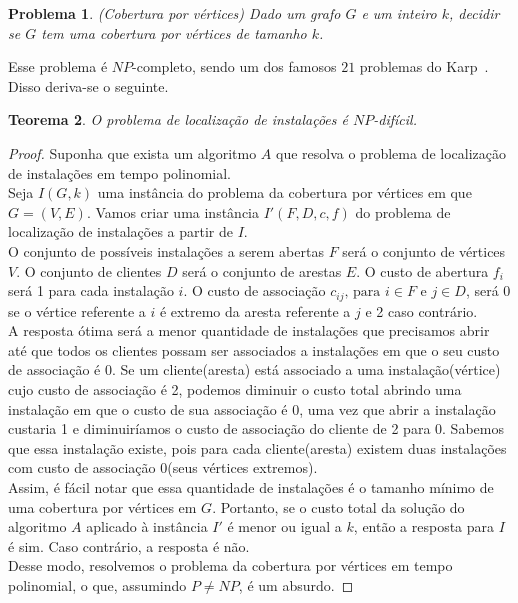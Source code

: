 \documentclass[12pt]{article}
\newtheorem{theorem}{Teorema}[section]
\newtheorem{problem}[theorem]{Problema}
\newcommand{\NP}{\mathit{NP}}
\begin{document}
\begin{problem}(Cobertura por vértices)
    Dado um grafo $G$ e um inteiro $k$, decidir se $G$ tem uma cobertura por vértices de tamanho $k$.
\end{problem}
Esse problema é $\NP$-completo, sendo um dos famosos $21$ problemas do Karp~\cite{Karp1972}. Disso deriva-se o seguinte.

\begin{theorem}
    O problema de localização de instalações é $\NP$-difícil.
\end{theorem}

\begin{proof}
    Suponha que exista um algoritmo $A$ que resolva o problema de localização de instalações em tempo polinomial. \\
    Seja $I(G,k)$ uma instância do problema da cobertura por vértices em que $G = (V,E)$. Vamos criar uma instância $I'(F,D,c,f)$ do problema de localização de instalações a partir de $I$.\\
    O conjunto de possíveis instalações a serem abertas $F$ será o conjunto de vértices $V$. O conjunto de clientes $D$ será o conjunto de arestas $E$. O custo de abertura $f_i$ será 1 para cada instalação $i$. O custo de associação $c_{ij} \text{, para } i \in F \text{ e } j \in D$, será 0 se o vértice referente a $i$ é extremo da aresta referente a $j$ e 2 caso contrário. \\
    A resposta ótima será a menor quantidade de instalações que precisamos abrir até que todos os clientes possam ser associados a instalações em que o seu custo de associação é 0. Se um cliente(aresta) está associado a uma instalação(vértice) cujo custo de associação é 2, podemos diminuir o custo total abrindo uma instalação em que o custo de sua associação é 0, uma vez que abrir a instalação custaria 1 e diminuiríamos o custo de associação do cliente de 2 para 0. Sabemos que essa instalação existe, pois para cada cliente(aresta) existem duas instalações com custo de associação 0(seus vértices extremos). \\
    Assim, é fácil notar que essa quantidade de instalações é o tamanho mínimo de uma cobertura por vértices em $G$. Portanto, se o custo total da solução do algoritmo $A$ aplicado à instância $I'$ é menor ou igual a $k$, então a resposta para $I$ é sim. Caso contrário, a resposta é não. \\
    Desse modo, resolvemos o problema da cobertura por vértices em tempo polinomial, o que, assumindo $P\neq\NP$, é um absurdo.
\end{proof}
\end{document}
